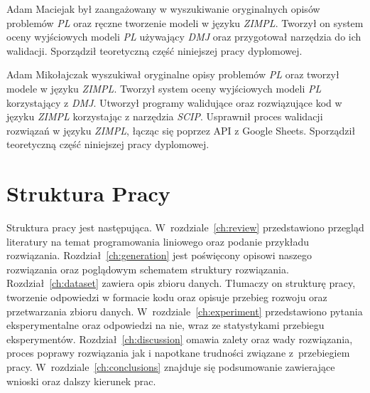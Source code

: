 Adam Maciejak był zaangażowany w wyszukiwanie oryginalnych opisów problemów \textit{PL} oraz ręczne tworzenie modeli w języku \textit{ZIMPL}. Tworzył on system oceny wyjściowych modeli \textit{PL} używający \textit{DMJ} oraz przygotował narzędzia do ich walidacji. Sporządził teoretyczną część niniejszej pracy dyplomowej.

Adam Mikołajczak wyszukiwał oryginalne opisy problemów \textit{PL} oraz tworzył modele w języku \textit{ZIMPL}. Tworzył system oceny wyjściowych modeli \textit{PL} korzystający z \textit{DMJ}. Utworzył programy walidujące oraz rozwiązujące kod w języku \textit{ZIMPL} korzystając z narzędzia \textit{SCIP}. Usprawnił proces walidacji rozwiązań w języku \textit{ZIMPL}, łącząc się poprzez API z Google Sheets. Sporządził teoretyczną część niniejszej pracy dyplomowej. 

\section{Struktura Pracy}

Struktura pracy jest następująca. W~rozdziale~\ref{ch:review} przedstawiono przegląd literatury na temat programowania liniowego oraz podanie przykładu rozwiązania. Rozdział~\ref{ch:generation} jest poświęcony opisowi naszego rozwiązania oraz poglądowym schematem struktury rozwiązania. Rozdział~\ref{ch:dataset} zawiera opis zbioru danych. Tłumaczy on strukturę pracy, tworzenie odpowiedzi w formacie kodu  oraz opisuje przebieg rozwoju oraz przetwarzania zbioru danych. W~rozdziale~\ref{ch:experiment} przedstawiono pytania eksperymentalne oraz odpowiedzi na nie, wraz ze statystykami przebiegu eksperymentów. Rozdział~\ref{ch:discussion} omawia zalety oraz wady rozwiązania, proces poprawy rozwiązania jak i napotkane trudności związane z~przebiegiem pracy. W~rozdziale~\ref{ch:conclusions} znajduje się podsumowanie zawierające wnioski oraz dalszy kierunek prac.
